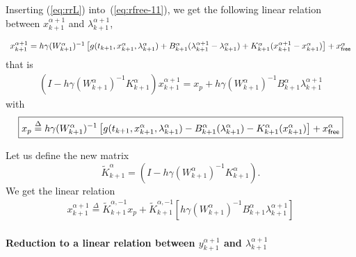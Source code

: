 Inserting (\ref{eq:rrL}) into~(\ref{eq:rfree-11}), we get the following linear relation between $x^{\alpha+1}_{k+1}$ and
$\lambda^{\alpha+1}_{k+1}$, 

\begin{equation}
   \begin{array}{l}
     x^{\alpha+1}_{k+1} = h\gamma(W^{\alpha}_{k+1} )^{-1}\left[g(t_{k+1},x^{\alpha}_{k+1},\lambda^{\alpha}_{k+1}) +
    B^{\alpha}_{k+1} (\lambda^{\alpha+1}_{k+1} - \lambda^{\alpha}_{k+1})+K^{\alpha}_{k+1}
    (x^{\alpha+1}_{k+1} - x^{\alpha}_{k+1}) \right ] +x^\alpha_{{\sf free}}
\end{array}
\end{equation}
that is 
\begin{equation}
  \begin{array}{l}
    (I-h \gamma (W^{\alpha}_{k+1})^{-1}K^{\alpha}_{k+1})x^{\alpha+1}_{k+1}=x_p + h \gamma (W^{\alpha}_{k+1})^{-1}    B^{\alpha}_{k+1} \lambda^{\alpha+1}_{k+1}
   \end{array}
\end{equation}
with 
\begin{equation}
  \boxed{x_p \stackrel{\Delta}{=}  h\gamma(W^{\alpha}_{k+1} )^{-1}\left[g(t_{k+1},x^{\alpha}_{k+1},\lambda^{\alpha}_{k+1}) 
    -B^{\alpha}_{k+1} (\lambda^{\alpha}_{k+1})-K^{\alpha}_{k+1} (x^{\alpha}_{k+1}) \right ] +x^\alpha_{{\sf free}}}
\end{equation}



Let us  define the new matrix
\begin{equation}
\tilde K^{\alpha}_{k+1}=(I-h \gamma (W^{\alpha}_{k+1})^{-1} K^{\alpha}_{k+1}).
\label{eq:hatW}
\end{equation}
We get the linear relation
\begin{equation}
  \label{eq:rfree-13}
  \begin{array}{l}
 \boxed{   x^{\alpha+1}_{k+1}\stackrel{\Delta}{=} \tilde K^{\alpha,-1}_{k+1} x_p + \tilde K^{\alpha,-1}_{k+1} \left[ h \gamma (W^{\alpha}_{k+1})^{-1}    B^{\alpha}_{k+1} \lambda^{\alpha+1}_{k+1}\right]}
   \end{array}
\end{equation}



\paragraph{Reduction to a linear relation between  $y^{\alpha+1}_{k+1}$ and
$\lambda^{\alpha+1}_{k+1}$}

